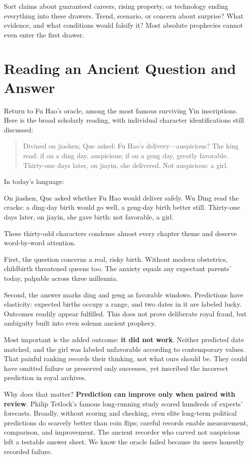 Sort claims about guaranteed careers, rising property, or technology ending everything into these drawers. Trend, scenario, or concern about surprise? What evidence, and what conditions would falsify it? Most absolute prophecies cannot even enter the first drawer.

\section{Reading an Ancient Question and Answer}
Return to Fu Hao's oracle, among the most famous surviving Yin inscriptions. Here is the broad scholarly reading, with individual character identifications still discussed:

\begin{quote}
Divined on jiashen; Que asked: Fu Hao's delivery---auspicious? The king read: if on a ding day, auspicious; if on a geng day, greatly favorable. Thirty-one days later, on jiayin, she delivered. Not auspicious: a girl.
\end{quote}
In today's language:

On jiashen, Que asked whether Fu Hao would deliver safely. Wu Ding read the cracks: a ding-day birth would go well, a geng-day birth better still. Thirty-one days later, on jiayin, she gave birth: not favorable, a girl.

These thirty-odd characters condense almost every chapter theme and deserve word-by-word attention.

First, the question concerns a real, risky birth. Without modern obstetrics, childbirth threatened queens too. The anxiety equals any expectant parents' today, palpable across three millennia.

Second, the answer marks ding and geng as favorable windows. Predictions have elasticity: expected births occupy a range, and two dates in it are labeled lucky. Outcomes readily appear fulfilled. This does not prove deliberate royal fraud, but ambiguity built into even solemn ancient prophecy.

Most important is the added outcome: \textbf{it did not work}. Neither predicted date matched, and the girl was labeled unfavorable according to contemporary values. That painful ranking records their thinking, not what ours should be. They could have omitted failure or preserved only successes, yet inscribed the incorrect prediction in royal archives.

Why does that matter? \textbf{Prediction can improve only when paired with review}. Philip Tetlock's famous long-running study scored hundreds of experts' forecasts. Broadly, without scoring and checking, even elite long-term political predictions do scarcely better than coin flips; careful records enable measurement, comparison, and improvement. The ancient recorder who carved not auspicious left a testable answer sheet. We know the oracle failed because its users honestly recorded failure.

